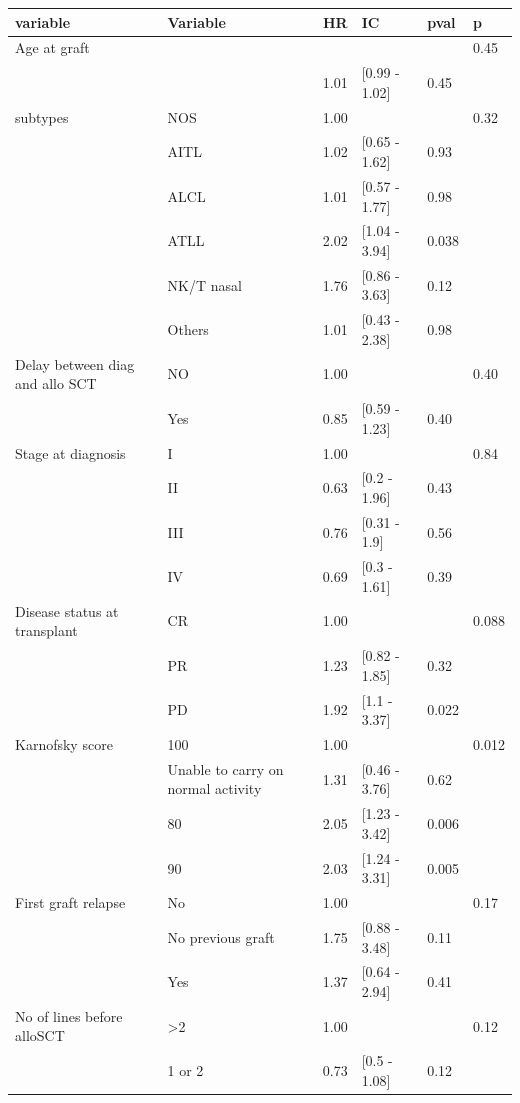 \documentclass[a4paper,11pt] {article}
\begin{document}
\begin{center}
\begin{landscape}
\begin{longtable}{llrlll}
  \hline
variable & Variable & HR & IC & pval & p \\ 
  \hline
Age at graft &  &  &  &  & 0.45 \\ 
   &  & 1.01 & [0.99 - 1.02] & 0.45 &  \\ 
  subtypes & NOS & 1.00 &  &  & 0.32 \\ 
   & AITL & 1.02 & [0.65 - 1.62] & 0.93 &  \\ 
   & ALCL & 1.01 & [0.57 - 1.77] & 0.98 &  \\ 
   & ATLL & 2.02 & [1.04 - 3.94] & 0.038 &  \\ 
   & NK/T nasal & 1.76 & [0.86 - 3.63] & 0.12 &  \\ 
   & Others & 1.01 & [0.43 - 2.38] & 0.98 &  \\ 
  Delay between diag and allo SCT & NO & 1.00 &  &  & 0.40 \\ 
   & Yes & 0.85 & [0.59 - 1.23] & 0.40 &  \\ 
  Stage at diagnosis & I & 1.00 &  &  & 0.84 \\ 
   & II & 0.63 & [0.2 - 1.96] & 0.43 &  \\ 
   & III & 0.76 & [0.31 - 1.9] & 0.56 &  \\ 
   & IV & 0.69 & [0.3 - 1.61] & 0.39 &  \\ 
  Disease status at transplant & CR & 1.00 &  &  & 0.088 \\ 
   & PR & 1.23 & [0.82 - 1.85] & 0.32 &  \\ 
   & PD & 1.92 & [1.1 - 3.37] & 0.022 &  \\ 
  Karnofsky score & 100 & 1.00 &  &  & 0.012 \\ 
   & Unable to carry on normal activity & 1.31 & [0.46 - 3.76] & 0.62 &  \\ 
   & 80 & 2.05 & [1.23 - 3.42] & 0.006 &  \\ 
   & 90 & 2.03 & [1.24 - 3.31] & 0.005 &  \\ 
  First graft relapse & No & 1.00 &  &  & 0.17 \\ 
   & No previous graft & 1.75 & [0.88 - 3.48] & 0.11 &  \\ 
   & Yes & 1.37 & [0.64 - 2.94] & 0.41 &  \\ 
  No of lines before alloSCT & >2 & 1.00 &  &  & 0.12 \\ 
   & 1 or 2 & 0.73 & [0.5 - 1.08] & 0.12 &  \\ 

\end{longtable}
\end{landscape}
\end{center}
\end{document}
